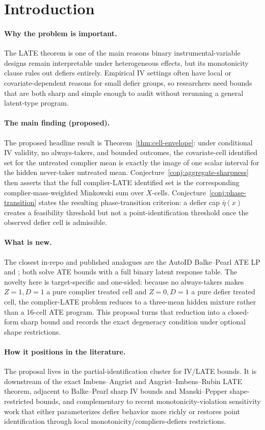 \documentclass[11pt]{article}
\theoremstyle{definition}
\theoremstyle{plain}
\theoremstyle{remark}
\begin{document}
\section{Introduction}
\paragraph{Why the problem is important.}
The LATE theorem is one of the main reasons binary instrumental-variable designs remain interpretable under heterogeneous effects, but its monotonicity clause rules out defiers entirely.  Empirical IV settings often have local or covariate-dependent reasons for small defier groups, so researchers need bounds that are both sharp and simple enough to audit without rerunning a general latent-type program.

\paragraph{The main finding (proposed).}
The proposed headline result is Theorem~\ref{thm:cell-envelope}: under conditional IV validity, no always-takers, and bounded outcomes, the covariate-cell identified set for the untreated complier mean is exactly the image of one scalar interval for the hidden never-taker untreated mean.  Conjecture~\ref{conj:aggregate-sharpness} then asserts that the full complier-LATE identified set is the corresponding complier-mass-weighted Minkowski sum over \(X\)-cells.  Conjecture~\ref{conj:phase-transition} states the resulting phase-transition criterion: a defier cap \(\bar\eta(x)\) creates a feasibility threshold but not a point-identification threshold once the observed defier cell is admissible.

\paragraph{What is new.}
The closest in-repo and published analogues are the AutoID Balke--Pearl ATE LP and \citet{BalkePearl1997}; both solve ATE bounds with a full binary latent response table.  The novelty here is target-specific and one-sided: because no always-takers makes \(Z=1,D=1\) a pure complier treated cell and \(Z=0,D=1\) a pure defier treated cell, the complier-LATE problem reduces to a three-mean hidden mixture rather than a 16-cell ATE program.  This proposal turns that reduction into a closed-form sharp bound and records the exact degeneracy condition under optional shape restrictions.

\paragraph{How it positions in the literature.}
The proposal lives in the partial-identification cluster for IV/LATE bounds.  It is downstream of the exact Imbens--Angrist and Angrist--Imbens--Rubin LATE theorem, adjacent to Balke--Pearl sharp IV bounds and Manski--Pepper shape-restricted bounds, and complementary to recent monotonicity-violation sensitivity work that either parameterizes defier behavior more richly or restores point identification through local monotonicity/compliers-defiers restrictions.
\end{document}
